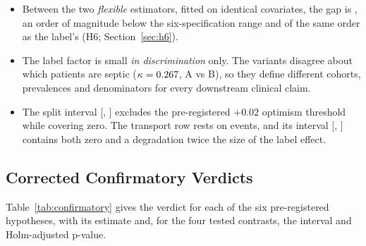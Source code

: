 \begin{itemize}
    \item Between the two \emph{flexible} estimators, fitted on identical
          covariates, the gap is \pcHSixAbsEst{}, an order of magnitude below
          the six-specification range and of the same order as the label's
          (H6; Section~\ref{sec:h6}).
    \item The label factor is small \emph{in discrimination} only. The
          variants disagree about which patients are septic
          ($\kappa = 0.267$, A vs B), so they define different cohorts,
          prevalences and denominators for every downstream clinical claim.
    \item The split interval [\pcHFourCiLo, \pcHFourCiHi] excludes the
          pre-registered $+0.02$ optimism threshold while covering zero. The
          transport row rests on \pcExtNEventsB{} events, and its interval
          [\pcHFiveCiLo, \pcHFiveCiHi] contains both zero and a degradation
          twice the size of the label effect.
\end{itemize}

\subsection{Corrected Confirmatory Verdicts}
\label{sec:confirmatory_verdicts}

Table~\ref{tab:confirmatory} gives the verdict for each of the six
pre-registered hypotheses, with its estimate and, for the four tested
contrasts, the interval and Holm-adjusted p-value.


